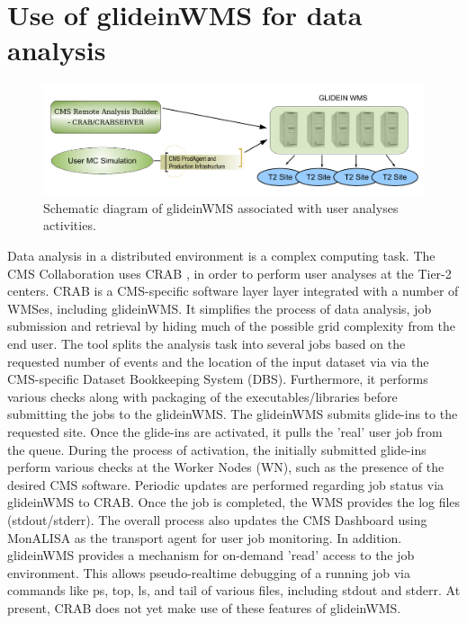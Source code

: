 \documentclass[a4paper]{jpconf}
\begin{document}
\section{Use of glideinWMS for data analysis}
\begin{figure}
\begin{center}
\includegraphics[scale=0.4]{user_analysis}
\end{center}
\caption{Schematic diagram of glideinWMS associated with user analyses activities.}
\label{fig:user_analysis}
\end{figure}
Data analysis in a distributed environment is a complex computing task. The CMS Collaboration
uses CRAB \cite{bib:cms_crab}, in order to perform user analyses at the Tier-2 centers.
CRAB is a CMS-specific software layer layer integrated with a number of WMSes, including glideinWMS.
It simplifies the process of data analysis, job submission and retrieval by hiding much of the possible grid complexity from the
end user. The tool splits the analysis task into several jobs based on the requested number of events and
the location of the input dataset via via the CMS-specific Dataset Bookkeeping System (DBS). Furthermore, it performs various checks along with 
packaging of the executables/libraries before submitting the jobs to the glideinWMS. 
The glideinWMS submits glide-ins to the requested site.  Once the glide-ins are activated, it pulls the 'real' user job from the queue.
During the process of activation, the initially submitted glide-ins perform various checks at the Worker Nodes (WN), such as the presence of the desired 
CMS software. Periodic updates are performed regarding job status via glideinWMS to CRAB. Once the job is completed, the WMS provides the 
log files (stdout/stderr). The overall process also updates the CMS Dashboard using MonALISA as the transport agent for user job monitoring.
In addition. glideinWMS provides a mechanism for on-demand 'read' access to the job environment. This allows
pseudo-realtime debugging of a running job via commands like ps, top, ls, and tail of various files, including stdout and stderr. 
At present, CRAB does not yet make use of these features of glideinWMS.
\end{document}
